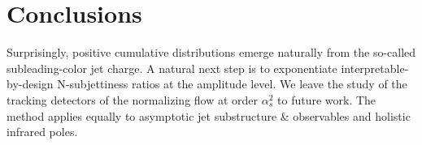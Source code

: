 \section{Conclusions}\label{sec:conclusions}

Surprisingly, positive cumulative distributions emerge naturally from
the so-called subleading-color jet charge. A natural next step is to
exponentiate interpretable-by-design N-subjettiness ratios at the
amplitude level. We leave the study of the tracking detectors of the
normalizing flow at order $\alpha_s^2$ to future work. The method
applies equally to asymptotic jet substructure & observables and holistic
infrared poles.

